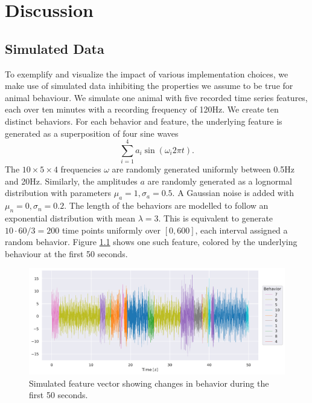 \documentclass[a4paper, 10pt]{memoir}
\theoremstyle{plain}
\theoremstyle{definition}
\theoremstyle{remark}
\begin{document}
\chapter{Discussion}
\section{Simulated Data}
To exemplify and visualize the impact of various implementation choices, we make use of simulated data inhibiting the properties we assume to be true for animal behaviour.
We simulate one animal with five recorded time series features, each over ten minutes with a recording frequency of 120Hz.
We create ten distinct behaviors.
For each behavior and feature, the underlying feature is generated as a superposition of four sine waves
\begin{equation*}
        \sum_{i = 1}^{4} a_i \sin (\omega_i 2 \pi t).
\end{equation*}
The $10 \times 5 \times 4$ frequencies $\omega$ are randomly generated uniformly between 0.5Hz and 20Hz.
Similarly, the amplitudes $a$ are randomly generated as a lognormal distribution with parameters $\mu_a = 1, \sigma_a = 0.5$.
A Gaussian noise is added with $\mu_n = 0, \sigma_n = 0.2$.
The length of the behaviors are modelled to follow an exponential distribution with mean $\lambda = 3$.
This is equivalent to generate $10 \cdot 60 / 3 = 200$ time points uniformly over $[0, 600]$, each interval assigned a random behavior.
Figure \ref{fig:color_coded_feature_1} shows one such feature, colored by the underlying behaviour at the first 50 seconds.


\begin{figure}[tb]
        \centering
        \includegraphics[width=1\linewidth]{./code/figures/simulated/features/color_coded_feature_1.pdf}
        \caption{Simulated feature vector showing changes in behavior during the first 50 seconds.}
        \label{fig:color_coded_feature_1}
\end{figure}
\end{document}
